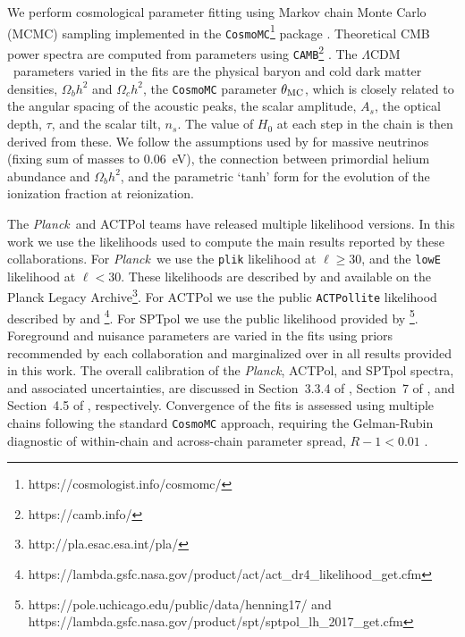 \documentclass[twocolumn]{aastex63}
\newcommand{\planck}{\textsl{Planck}}
\newcommand{\lcdm}{\ensuremath{\Lambda\mathrm{CDM}}}
\begin{document}
We perform cosmological parameter fitting using Markov chain Monte Carlo (MCMC) sampling implemented in the \texttt{CosmoMC}\footnote{https://cosmologist.info/cosmomc/} package \citep{lewis/bridle:2002,lewis:2013}. Theoretical CMB power spectra are computed from parameters using \texttt{CAMB}\footnote{https://camb.info/} \citep{lewis/challinor/lasenby:2000,howlett/etal:2012}. The \lcdm\ parameters varied in the fits are the physical baryon and cold dark matter densities, $\Omega_bh^2$ and $\Omega_ch^2$, the \texttt{CosmoMC} parameter $\theta_{\rm MC}$, which is closely related to the angular spacing of the acoustic peaks, the scalar amplitude, $A_s$, the optical depth, $\tau$, and the scalar tilt, $n_s$. The value of $H_0$ at each step in the chain is then derived from these. We follow the assumptions used by \cite{planck2016-l06} for massive neutrinos (fixing sum of masses to $0.06$~eV), the connection between primordial helium abundance and $\Omega_bh^2$, and the parametric `tanh' form for the evolution of the ionization fraction at reionization.

The \planck\ and ACTPol teams have released multiple likelihood versions. In this work we use the likelihoods used to compute the main results reported by these collaborations. For \planck\ we use the \texttt{plik} likelihood at $\ell\geq30$, and the \texttt{lowE} likelihood at $\ell<30$. These likelihoods are described by \cite{planck2016-l05} and available on the Planck Legacy Archive\footnote{http://pla.esac.esa.int/pla/}. For ACTPol we use the public \texttt{ACTPollite} likelihood described by \cite{choi/etal:2020} and \cite{aiola/etal:2020}\footnote{https://lambda.gsfc.nasa.gov/product/act/act\_dr4\_likelihood\_get.cfm}. For SPTpol we use the public likelihood provided by \cite{henning/etal:2018}\footnote{https://pole.uchicago.edu/public/data/henning17/ and https://lambda.gsfc.nasa.gov/product/spt/sptpol\_lh\_2017\_get.cfm}. Foreground and nuisance parameters are varied in the fits using priors recommended by each collaboration and marginalized over in all results provided in this work. The overall calibration of the \planck, ACTPol, and SPTpol spectra, and associated uncertainties, are discussed in Section~3.3.4 of \cite{planck2016-l05}, Section~7 of \cite{choi/etal:2020}, and Section~4.5 of \cite{henning/etal:2018}, respectively. Convergence of the fits is assessed using multiple chains following the standard \texttt{CosmoMC} approach, requiring the Gelman-Rubin diagnostic of within-chain and across-chain parameter spread, $R-1<0.01$ \citep{gelman/rubin:1992}.
\end{document}
